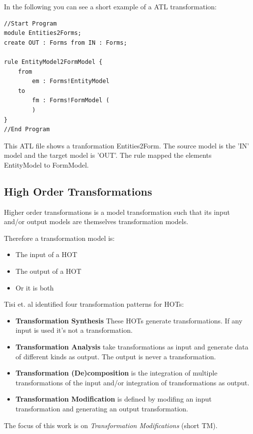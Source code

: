 \documentclass{llncs}
\begin{document}
In the following you can see a short example of a ATL transformation:
\begin{verbatim}
//Start Program
module Entities2Forms;
create OUT : Forms from IN : Forms;

rule EntityModel2FormModel {
	from
		em : Forms!EntityModel
	to 
		fm : Forms!FormModel (
		)
}
//End Program
\end{verbatim}

This ATL file shows a tranformation Entities2Form. The source model is the 'IN'
model and the target model is 'OUT'. The rule mapped the elements EntityModel to
FormModel. 


\subsection{High Order Transformations}

Higher order transformations is a model transformation such that its input and/or output models are themselves transformation models.\cite{Tisi:2009}

Therefore a transformation model is:

\begin{itemize}
	\item The input of a HOT
	\item The output of a HOT
	\item Or it is both
\end{itemize}

Tisi et. al identified four transformation patterns for HOTs:

\begin{itemize}
	\item \textbf{Transformation Synthesis} These HOTs generate transformations. If any input is used it's not a transformation.
	\item \textbf{Transformation Analysis} take transformations as input and generate data of different kinds as output. The output is never a transformation.
	\item \textbf{Transformation (De)composition} is the integration of multiple transformations of the input and/or integration of transformations as output.
	\item \textbf{Transformation Modification} is defined by modifing an input transformation and generating an output transformation.
\end{itemize}

The focus of this work is on \textit{Transformation Modifications} (short TM). 
\end{document}
